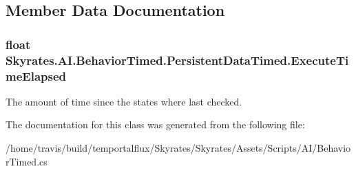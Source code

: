 \subsection{Member Data Documentation}
\hypertarget{class_skyrates_1_1_a_i_1_1_behavior_timed_1_1_persistent_data_timed_a5bace690d7d24e32ac9c47f0ff8e2f2c}{
\subsubsection[{Execute\-Time\-Elapsed}]{\setlength{\rightskip}{0pt plus 5cm}float Skyrates.\-A\-I.\-Behavior\-Timed.\-Persistent\-Data\-Timed.\-Execute\-Time\-Elapsed}}\label{class_skyrates_1_1_a_i_1_1_behavior_timed_1_1_persistent_data_timed_a5bace690d7d24e32ac9c47f0ff8e2f2c}


The amount of time since the states where last checked. 



The documentation for this class was generated from the following file\-:\begin{DoxyCompactItemize}
\item 
/home/travis/build/temportalflux/\-Skyrates/\-Skyrates/\-Assets/\-Scripts/\-A\-I/Behavior\-Timed.\-cs\end{DoxyCompactItemize}
